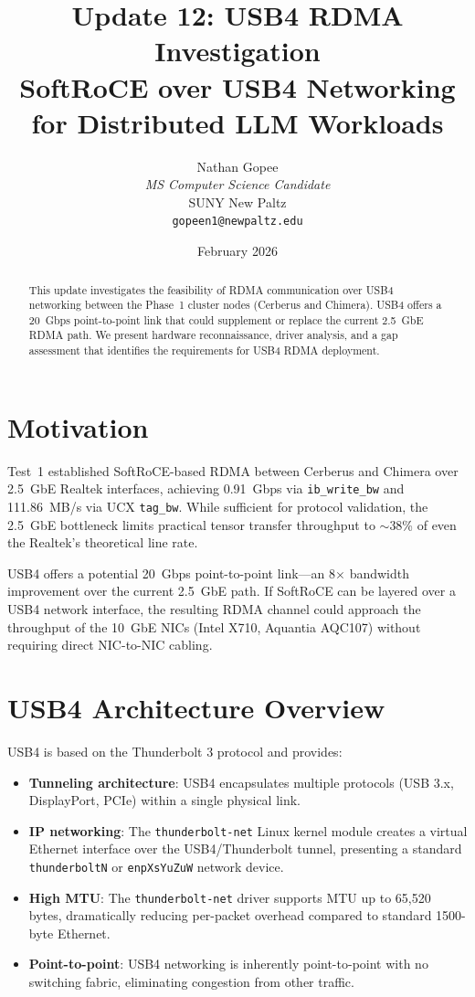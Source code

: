 \documentclass[11pt,letterpaper]{article}
\title{
    \vspace{-1cm}
    \textbf{Update 12: USB4 RDMA Investigation} \\[0.5em]
    \large SoftRoCE over USB4 Networking for Distributed LLM Workloads
}
\author{
    Nathan Gopee \\
    \textit{MS Computer Science Candidate} \\
    SUNY New Paltz \\
    \texttt{gopeen1@newpaltz.edu}
}
\date{February 2026}
\begin{document}
\maketitle

\begin{abstract}
\noindent
This update investigates the feasibility of RDMA communication over USB4 networking between the Phase~1 cluster nodes (Cerberus and Chimera). USB4 offers a 20~Gbps point-to-point link that could supplement or replace the current 2.5~GbE RDMA path. We present hardware reconnaissance, driver analysis, and a gap assessment that identifies the requirements for USB4 RDMA deployment.
\end{abstract}

\section{Motivation}

Test~1 established SoftRoCE-based RDMA between Cerberus and Chimera over 2.5~GbE Realtek interfaces, achieving 0.91~Gbps via \texttt{ib\_write\_bw} and 111.86~MB/s via UCX \texttt{tag\_bw}. While sufficient for protocol validation, the 2.5~GbE bottleneck limits practical tensor transfer throughput to $\sim$38\% of even the Realtek's theoretical line rate.

USB4 offers a potential 20~Gbps point-to-point link---an 8$\times$ bandwidth improvement over the current 2.5~GbE path. If SoftRoCE can be layered over a USB4 network interface, the resulting RDMA channel could approach the throughput of the 10~GbE NICs (Intel X710, Aquantia AQC107) without requiring direct NIC-to-NIC cabling.

\section{USB4 Architecture Overview}

USB4 is based on the Thunderbolt 3 protocol and provides:

\begin{itemize}
    \item \textbf{Tunneling architecture}: USB4 encapsulates multiple protocols (USB 3.x, DisplayPort, PCIe) within a single physical link.
    \item \textbf{IP networking}: The \texttt{thunderbolt-net} Linux kernel module creates a virtual Ethernet interface over the USB4/Thunderbolt tunnel, presenting a standard \texttt{thunderboltN} or \texttt{enpXsYuZuW} network device.
    \item \textbf{High MTU}: The \texttt{thunderbolt-net} driver supports MTU up to 65,520 bytes, dramatically reducing per-packet overhead compared to standard 1500-byte Ethernet.
    \item \textbf{Point-to-point}: USB4 networking is inherently point-to-point with no switching fabric, eliminating congestion from other traffic.
\end{itemize}
\end{document}
